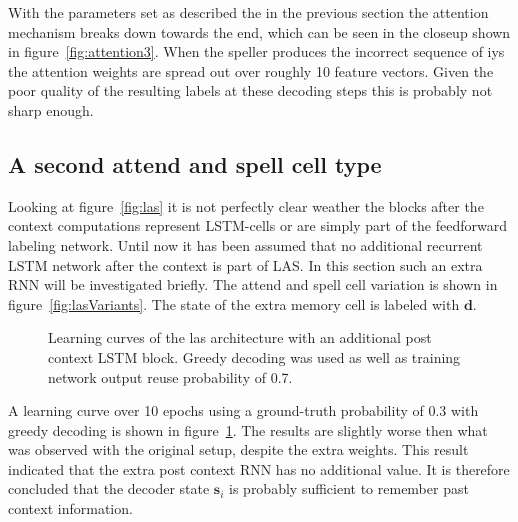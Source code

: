 With the parameters set as described the in the previous section the attention mechanism breaks down towards the end, which can be seen in the closeup shown in figure~\ref{fig:attention3}. When the speller produces the incorrect sequence of iys the attention weights are spread out over roughly 10 feature vectors. Given the poor quality of the resulting labels at these decoding steps this is probably not sharp enough.


\subsection{A second attend and spell cell type}
Looking at figure~\ref{fig:las} it is not perfectly clear weather the blocks after the context computations represent LSTM-cells or are simply part of the feedforward labeling network. Until now it has been assumed that no additional recurrent LSTM network after the context is part of LAS. In this section such an extra RNN will be investigated briefly. 
The attend and spell cell variation is shown in figure~\ref{fig:lasVariants}. The state of the extra memory cell is labeled with $\mathbf{d}$.
\begin{figure}
\centering


\caption{Learning curves of the las architecture with an additional post context LSTM block. Greedy decoding was used as well as training network output reuse probability of 0.7.}
\label{fig:variantResult}
\end{figure}
A learning curve over 10 epochs using a ground-truth probability of 0.3 with greedy decoding is shown in figure~\ref{fig:variantResult}. The results are slightly worse then what was observed with the original setup, despite the extra weights. This result indicated that the extra post context RNN has no additional value.
It is therefore concluded that the decoder state $\mathbf{s}_i$ is probably sufficient to remember past context information.


